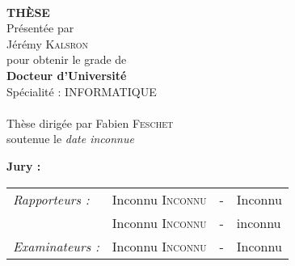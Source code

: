 

\begin{titlepage}
\begin{center}
 \\
\vspace*{0.1cm}
\vspace*{0.1cm}
\vspace*{0.1cm}

\vspace*{0.5cm}
\noindent \Huge \textbf{THÈSE} \\
\vspace*{0.3cm}
\noindent \large {Présentée par\\}
\noindent \LARGE Jérémy \textsc{Kalsron} \\
\vspace*{0.8cm}
\noindent \large {pour obtenir le grade de} \\
\noindent \LARGE \textbf{Docteur d'Université} \\
\vspace*{0.3cm}
\noindent \large {Spécialité : INFORMATIQUE} \\
\vspace*{0.8cm}
 \\
\vspace*{0.8cm}
\noindent \Large Thèse dirigée par Fabien \textsc{Feschet} \\
\vspace*{0.2cm}
\noindent \large soutenue le \textit{date inconnue} \\
\vspace*{0.2cm}
\end{center}
\noindent \large \textbf{Jury :} \\
\begin{center}
\noindent \large 
\begin{tabular}{llcl}
      \textit{Rapporteurs :}	& Inconnu \textsc{Inconnu}		& - & Inconnu \\
                              & Inconnu \textsc{Inconnu}		& - & inconnu \\
      \textit{Examinateurs :} & Inconnu \textsc{Inconnu}		& - & Inconnu \\

\end{tabular}
\end{center}
\end{titlepage}
